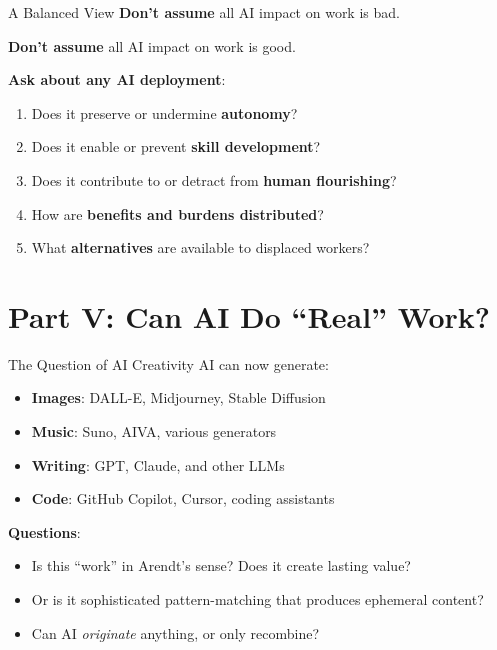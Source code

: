 ﻿\documentclass[aspectratio=169,11pt]{beamer}
\begin{document}
\begin{frame}{A Balanced View}
\textbf{Don't assume} all AI impact on work is bad.

\textbf{Don't assume} all AI impact on work is good.

\vspace{0.3em}
\textbf{Ask about any AI deployment}:
\begin{enumerate}
    \item Does it preserve or undermine \textbf{autonomy}?
    \item Does it enable or prevent \textbf{skill development}?
    \item Does it contribute to or detract from \textbf{human flourishing}?
    \item How are \textbf{benefits and burdens distributed}?
    \item What \textbf{alternatives} are available to displaced workers?
\end{enumerate}
\end{frame}

\section{Part V: Can AI Do ``Real'' Work?}

\begin{frame}{The Question of AI Creativity}
AI can now generate:
\begin{itemize}
    \item \textbf{Images}: DALL-E, Midjourney, Stable Diffusion
    \item \textbf{Music}: Suno, AIVA, various generators
    \item \textbf{Writing}: GPT, Claude, and other LLMs
    \item \textbf{Code}: GitHub Copilot, Cursor, coding assistants
\end{itemize}

\vspace{0.3em}
\textbf{Questions}:
\begin{itemize}
    \item Is this ``work'' in Arendt's sense? Does it create lasting value?
    \item Or is it sophisticated pattern-matching that produces ephemeral content?
    \item Can AI \emph{originate} anything, or only recombine?
\end{itemize}
\end{frame}
\end{document}

